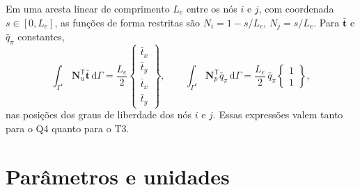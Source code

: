 \documentclass[11pt,a4paper]{article}
\numberwithin{equation}{section}
\newcommand{\dd}{\mathrm{d}}
\begin{document}
Em uma aresta linear de comprimento $L_e$ entre os nós $i$ e $j$, com
coordenada $s\in[0,L_e]$, as funções de forma restritas são
$N_i=1-s/L_e$, $N_j=s/L_e$. Para $\bar{\mathbf t}$ e $\bar q_\pi$ constantes,
\begin{equation}
\int_{\Gamma^e}\mathbf N_u^{\mathsf T}\bar{\mathbf t}\,\dd\Gamma
=\frac{L_e}{2}\begin{Bmatrix}\bar t_x\\ \bar t_y\\ \bar t_x\\ \bar t_y\end{Bmatrix},
\qquad
\int_{\Gamma^e}\mathbf N_p^{\mathsf T}\bar q_\pi\,\dd\Gamma
=\frac{L_e}{2}\,\bar q_\pi\begin{Bmatrix}1\\1\end{Bmatrix},
\end{equation}
nas posições dos graus de liberdade dos nós $i$ e $j$. Essas expressões
valem tanto para o Q4 quanto para o T3.

\section{Par\^ametros e unidades}
\end{document}

